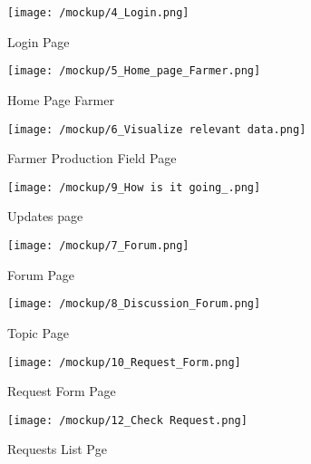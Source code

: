 	\begin{figure}[ht!]
		\centering
		\begin{minipage}{0.6\textwidth}
			\centering
			\texttt{[image: /mockup/4\_Login.png]}
			\caption{Login Page}
		\end{minipage}
	\end{figure}

	\begin{figure}[ht!]
		\centering
		\begin{minipage}{0.5\textwidth}
			\centering
			\texttt{[image: /mockup/5\_Home\_page\_Farmer.png]}
			\caption{Home Page Farmer}
		\end{minipage}\hfill
		\begin{minipage}{0.5\textwidth}
			\centering
			\texttt{[image: /mockup/6\_Visualize relevant data.png]}
			\caption{Farmer Production Field Page}
		\end{minipage}
	\end{figure}

	\begin{figure}[ht!]
		\centering
		\begin{minipage}{0.75\textwidth}
			\centering
			\texttt{[image: /mockup/9\_How is it going\_.png]}
			\caption{Updates page}
		\end{minipage} 
	\end{figure}


	\begin{figure}[ht!]
		\centering
		\begin{minipage}{0.5\textwidth}
			\centering
			\texttt{[image: /mockup/7\_Forum.png]}
			\caption{Forum Page}
		\end{minipage}\hfill
		\begin{minipage}{0.5\textwidth}
			\centering
			\texttt{[image: /mockup/8\_Discussion\_Forum.png]}
			\caption{Topic Page}
		\end{minipage}
	\end{figure}

    \begin{figure}[ht!]
    	\centering
    	\begin{minipage}{0.5\textwidth}
    		\centering
    		\texttt{[image: /mockup/10\_Request\_Form.png]}
    		\caption{Request Form Page}
    	\end{minipage}\hfill
    	\begin{minipage}{0.5\textwidth}
    		\centering
    		\texttt{[image: /mockup/12\_Check Request.png]}
    		\caption{Requests List Pge}
    	\end{minipage}
    \end{figure}

